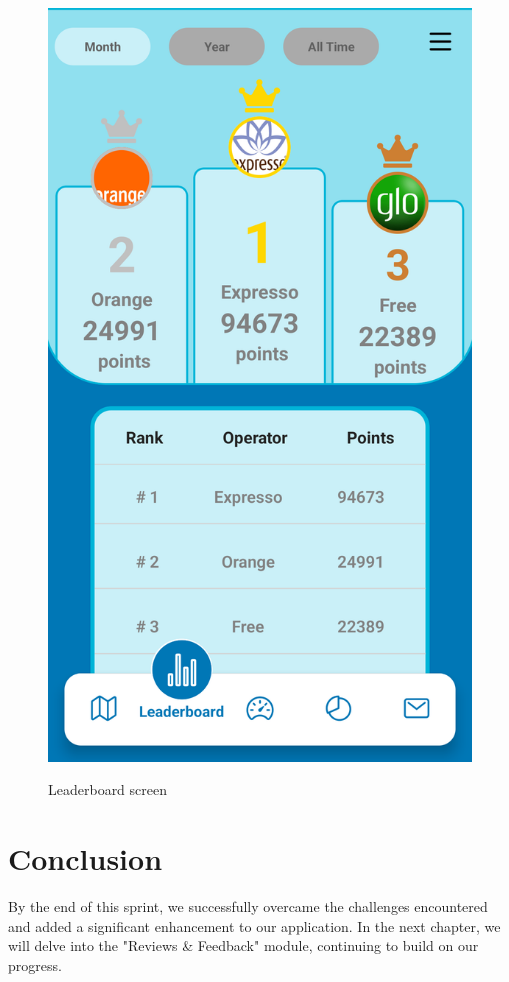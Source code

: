 \begin{center}
    
\begin{figure}[H]
    \centering
    \includegraphics[width=0.3\linewidth]{images/sprint3/leaderBoardModule (1).png}
    \label{fig:login-form}
    \caption{Leaderboard screen}
\end{figure}
\end{center}


\section*{Conclusion}

By the end of this sprint, we successfully overcame the challenges encountered and added a significant enhancement to our application. In the next chapter, we will delve into the "Reviews \& Feedback" module, continuing to build on our progress.
